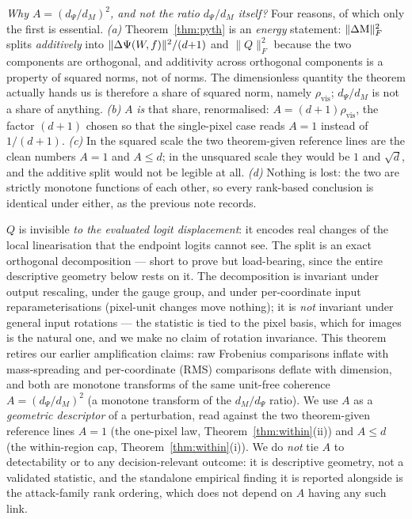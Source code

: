 \begin{clarifybox}
\emph{Why $A=(d_\Psi/d_M)^2$, and not the ratio $d_\Psi/d_M$ itself?} Four reasons,
of which only the first is essential. \emph{(a)} Theorem~\ref{thm:pyth} is an
\emph{energy} statement: $\|\Delta\mathrm{M}\|_F^2$ splits \emph{additively} into
$\|\Delta\Psi(W\!,f)\|^2/(d{+}1)$ and $\|Q\|_F^2$ because the two components are
orthogonal, and additivity across orthogonal components is a property of
squared norms, not of norms. The dimensionless quantity the theorem actually
hands us is therefore a share of squared norm, namely $\rho_{\mathrm{vis}}$;
$d_\Psi/d_M$ is not a share of anything. \emph{(b)} $A$ \emph{is} that share,
renormalised: $A=(d{+}1)\rho_{\mathrm{vis}}$, the factor $(d{+}1)$ chosen so
that the single-pixel case reads $A=1$ instead of $1/(d{+}1)$. \emph{(c)} In
the squared scale the two theorem-given reference lines are the clean numbers
$A=1$ and $A\le d$; in the unsquared scale they would be $1$ and $\sqrt d$,
and the additive split would not be legible at all. \emph{(d)} Nothing is
lost: the two are strictly monotone functions of each other, so every
rank-based conclusion is identical under either, as the previous note records.
\end{clarifybox}

$Q$ is invisible \emph{to the evaluated logit displacement}: it encodes real
changes of the local linearisation that the endpoint logits cannot see. The
split is an exact orthogonal decomposition --- short to prove but load-bearing,
since the entire descriptive geometry below rests on it. The
decomposition is invariant under output rescaling, under the gauge group, and
under per-coordinate input reparameterisations (pixel-unit changes move
nothing); it is \emph{not} invariant under general input rotations --- the
statistic is tied to the pixel basis, which for images is the natural one, and
we make no claim of rotation invariance.
This theorem retires our earlier amplification claims: raw Frobenius
comparisons inflate with mass-spreading and per-coordinate (RMS) comparisons
deflate with dimension, and both are monotone transforms of the same
unit-free coherence $A=(d_\Psi/d_M)^2$ (a monotone transform of the $d_M/d_\Psi$
ratio). We use $A$ as a \emph{geometric descriptor} of a perturbation, read
against the two theorem-given reference lines $A=1$ (the one-pixel law,
Theorem~\ref{thm:within}(ii)) and $A\le d$ (the within-region cap,
Theorem~\ref{thm:within}(i)). We do \emph{not} tie $A$ to detectability or to
any decision-relevant outcome: it is descriptive geometry, not a validated
statistic, and the standalone empirical finding it is reported alongside is the
attack-family rank ordering, which does not depend on $A$ having any such link.


